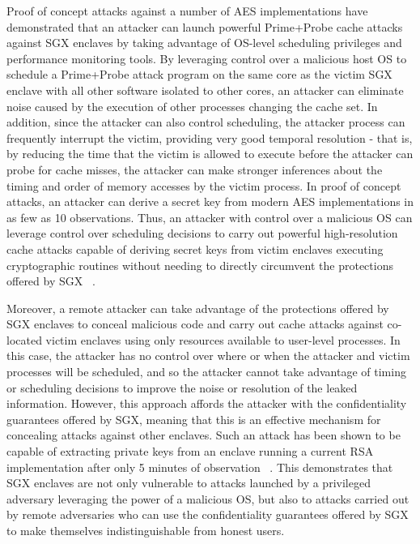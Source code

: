 Proof of concept attacks against a number of AES implementations have demonstrated that an attacker can launch powerful Prime+Probe cache attacks against SGX enclaves by taking advantage of OS-level scheduling privileges and performance monitoring tools. By leveraging control over a malicious host OS to schedule a Prime\-+Probe attack program on the same core as the victim SGX enclave with all other software isolated to other cores, an attacker can eliminate noise caused by the execution of other processes changing the cache set. In addition, since the attacker can also control scheduling, the attacker process can frequently interrupt the victim, providing very good temporal resolution - that is, by reducing the time that the victim is allowed to execute before the attacker can probe for cache misses, the attacker can make stronger inferences about the timing and order of memory accesses by the victim process. In proof of concept attacks, an attacker can derive a secret key from modern AES implementations in as few as 10 observations. Thus, an attacker with control over a malicious OS can leverage control over scheduling decisions to carry out powerful high-resolution cache attacks capable of deriving secret keys from victim enclaves executing cryptographic routines without needing to directly circumvent the protections offered by SGX ~\cite{moghimi_cachezoom:_2017, gotzfried_cache_2017}.

Moreover, a remote attacker can take advantage of the protections offered by SGX enclaves to conceal malicious code and carry out cache attacks against co-located victim enclaves using only resources available to user-level processes. In this case, the attacker has no control over where or when the attacker and victim processes will be scheduled, and so the attacker cannot take advantage of timing or scheduling decisions to improve the noise or resolution of the leaked information. However, this approach affords the attacker with the confidentiality guarantees offered by SGX, meaning that this is an effective mechanism for concealing attacks against other enclaves. Such an attack has been shown to be capable of extracting private keys from an enclave running a current RSA implementation after only 5 minutes of observation ~\cite{schwarz_malware_2017}. This demonstrates that SGX enclaves are not only vulnerable to attacks launched by a privileged adversary leveraging the power of a malicious OS, but also to attacks carried out by remote adversaries who can use the confidentiality guarantees offered by SGX to make themselves indistinguishable from honest users.

